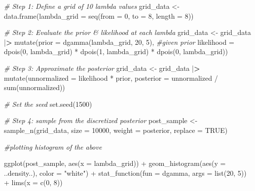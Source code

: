 \documentclass[
]{article}
\newenvironment{Shaded}{\begin{snugshade}}{\end{snugshade}}
\newcommand{\AttributeTok}[1]{\textcolor[rgb]{0.77,0.63,0.00}{#1}}
\newcommand{\CommentTok}[1]{\textcolor[rgb]{0.56,0.35,0.01}{\textit{#1}}}
\newcommand{\ConstantTok}[1]{\textcolor[rgb]{0.00,0.00,0.00}{#1}}
\newcommand{\DecValTok}[1]{\textcolor[rgb]{0.00,0.00,0.81}{#1}}
\newcommand{\ErrorTok}[1]{\textcolor[rgb]{0.64,0.00,0.00}{\textbf{#1}}}
\newcommand{\FunctionTok}[1]{\textcolor[rgb]{0.00,0.00,0.00}{#1}}
\newcommand{\NormalTok}[1]{#1}
\newcommand{\OtherTok}[1]{\textcolor[rgb]{0.56,0.35,0.01}{#1}}
\newcommand{\SpecialCharTok}[1]{\textcolor[rgb]{0.00,0.00,0.00}{#1}}
\newcommand{\StringTok}[1]{\textcolor[rgb]{0.31,0.60,0.02}{#1}}
\begin{document}
\begin{Shaded}
\begin{Highlighting}[]
\CommentTok{\# Step 1: Define a grid of 10 lambda values}
\NormalTok{grid\_data   }\OtherTok{\textless{}{-}} \FunctionTok{data.frame}\NormalTok{(}\AttributeTok{lambda\_grid =} \FunctionTok{seq}\NormalTok{(}\AttributeTok{from =} \DecValTok{0}\NormalTok{, }\AttributeTok{to =} \DecValTok{8}\NormalTok{, }\AttributeTok{length =} \DecValTok{8}\NormalTok{)) }

\CommentTok{\# Step 2: Evaluate the prior \& likelihood at each lambda}
\NormalTok{grid\_data }\OtherTok{\textless{}{-}}\NormalTok{ grid\_data }\SpecialCharTok{|}\ErrorTok{\textgreater{}} 
  \FunctionTok{mutate}\NormalTok{(}\AttributeTok{prior =} \FunctionTok{dgamma}\NormalTok{(lambda\_grid, }\DecValTok{20}\NormalTok{, }\DecValTok{5}\NormalTok{), }\CommentTok{\#given prior}
         \AttributeTok{likelihood =} \FunctionTok{dpois}\NormalTok{(}\DecValTok{0}\NormalTok{, lambda\_grid) }\SpecialCharTok{*} \FunctionTok{dpois}\NormalTok{(}\DecValTok{1}\NormalTok{, lambda\_grid) }\SpecialCharTok{*} \FunctionTok{dpois}\NormalTok{(}\DecValTok{0}\NormalTok{, lambda\_grid))}

\CommentTok{\# Step 3: Approximate the posterior}
\NormalTok{grid\_data }\OtherTok{\textless{}{-}}\NormalTok{ grid\_data }\SpecialCharTok{|}\ErrorTok{\textgreater{}} 
  \FunctionTok{mutate}\NormalTok{(}\AttributeTok{unnormalized =}\NormalTok{ likelihood }\SpecialCharTok{*}\NormalTok{ prior,}
         \AttributeTok{posterior =}\NormalTok{ unnormalized }\SpecialCharTok{/} \FunctionTok{sum}\NormalTok{(unnormalized))}

\CommentTok{\# Set the seed}
\FunctionTok{set.seed}\NormalTok{(}\DecValTok{1500}\NormalTok{)}

\CommentTok{\# Step 4: sample from the discretized posterior}
\NormalTok{post\_sample }\OtherTok{\textless{}{-}} \FunctionTok{sample\_n}\NormalTok{(grid\_data, }\AttributeTok{size =} \DecValTok{10000}\NormalTok{, }
                        \AttributeTok{weight =}\NormalTok{ posterior, }\AttributeTok{replace =} \ConstantTok{TRUE}\NormalTok{)}

\CommentTok{\#plotting histogram of the above }

\FunctionTok{ggplot}\NormalTok{(post\_sample, }\FunctionTok{aes}\NormalTok{(}\AttributeTok{x =}\NormalTok{ lambda\_grid)) }\SpecialCharTok{+} 
  \FunctionTok{geom\_histogram}\NormalTok{(}\FunctionTok{aes}\NormalTok{(}\AttributeTok{y =}\NormalTok{ ..density..), }\AttributeTok{color =} \StringTok{"white"}\NormalTok{) }\SpecialCharTok{+} 
  \FunctionTok{stat\_function}\NormalTok{(}\AttributeTok{fun =}\NormalTok{ dgamma, }\AttributeTok{args =} \FunctionTok{list}\NormalTok{(}\DecValTok{20}\NormalTok{, }\DecValTok{5}\NormalTok{)) }\SpecialCharTok{+} 
  \FunctionTok{lims}\NormalTok{(}\AttributeTok{x =} \FunctionTok{c}\NormalTok{(}\DecValTok{0}\NormalTok{, }\DecValTok{8}\NormalTok{))}
\end{Highlighting}
\end{Shaded}
\end{document}
